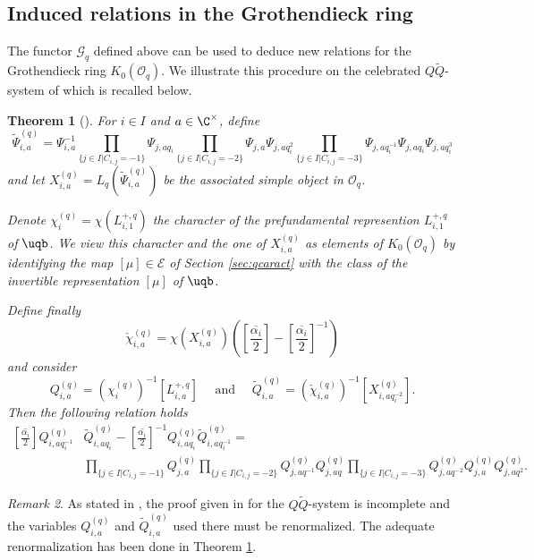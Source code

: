 \documentclass[11pt]{amsart}
\newtheorem{theorem}{Theorem}[section]
\theoremstyle{definition}
\theoremstyle{remark}
\newtheorem{rem}[theorem]{Remark}
\numberwithin{equation}{section}
\begin{document}
\subsection{Induced relations in the Grothendieck ring}\label{sec:FGroth}
The functor $\mathcal{G}_q$ defined above can be used to deduce new relations for the Grothendieck ring $K_0(\mathcal{O}_q)$. We illustrate this procedure on the celebrated $Q\widetilde{Q}$-system of \cite{fh2} which is recalled below.\newpage
\begin{theorem}[{\cite[Section 3.1]{fh2}}]\label{thm:QQtilde} For $i\in I$ and $a\in \C^{\times}$, define
\begin{equation}\label{eq:Psitilde} \tilde{\Psi}_{i,a}^ {(q)} =\Psi_{i,a}^{-1}\prod_{\{j\in I|C_{i,j}=-1\}}\Psi_{j,aq_i}\prod_{\{j\in I|C_{i,j}=-2\}}\Psi_{j,a}\Psi_{j,aq_i^2}\prod_{\{j\in I|C_{i,j}=-3\}} \Psi_{j,aq_i^{-1}}\Psi_{j,aq_i}\Psi_{j,aq_i^3}
\end{equation}
and let $X_{i,a}^{(q)} = L_q(\tilde{\Psi}_{i,a}^{(q)})$ be the associated simple object in $\mathcal{O}_q$.\par Denote $\chi_i^{(q)}=\chi(L_{i,1}^{+,q})$ the character of the prefundamental represention $L_{i,1}^{+,q}$ of $\uqb$.  We view this character and the one of $X_{i,a}^{(q)}$ as elements of $K_0(\mathcal{O}_q)$ by identifying the map $[\mu]\in \mathcal{E}$ of Section \ref{sec:qcaract} with the class of the invertible representation $[\mu]$ of $\uqb$. \par Define finally 
$$ \check{\chi}_{i,a}^{(q)}=\chi(X_{i,a}^{(q)})\left(\textstyle \left[\overline{\frac{\alpha_i}{2}}\right]-\left[\overline{\frac{\alpha_i}{2}}\right]^{-1}\right) $$
and consider $$Q_{i,a}^{(q)} = (\chi_i^{(q)})^{-1}[L_{i,a}^{+,q}]\quad\text{ and }\quad\tilde{Q}_{i,a}^{(q)} = (\check{\chi}_{i,a}^{(q)})^{-1}[X_{i,aq_i^{-2}}^{(q)}].$$  
Then the following relation holds 
\begin{align}\label{eq:QQtilde}
{\textstyle \left[\overline{\frac{\alpha_i}{2}}\right]}Q_{i,aq_i^{-1}}^{(q)}&\tilde{Q}_{i,aq_i}^{(q)}-{\textstyle\left[\overline{\frac{\alpha_i}{2}}\right]^{-1}}Q_{i,aq_i}^{(q)}\tilde{Q}_{i,aq_i^{-1}}^{(q)} =\\ &\prod_{\{j\in I|	C_{i,j}=-1\}}Q_{j,a}^{(q)}\prod_{\{j\in I|	C_{i,j}=-2\}}Q_{j,aq^{-1}}^{(q)}Q_{j,aq}^{(q)}\prod_{\{j\in I|C_{i,j}=-3\}}Q_{j,aq^{-2}}^{(q)}Q_{j,a}^{(q)}Q_{j,aq^2}^{(q)}.\nonumber
\end{align}
\end{theorem}
\begin{rem} As stated in \cite[Section 5.7]{fhr}, the proof given in \cite{fh2} for the $Q\widetilde{Q}$-system is incomplete and the variables $Q_{i,a}^{(q)}$ and $\tilde{Q}_{i,a}^{(q)}$ used there must be renormalized. The adequate renormalization has been done in Theorem \ref{thm:QQtilde}.
\end{rem}
\end{document}
